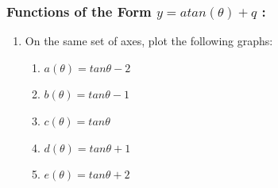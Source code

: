             \subsubsection{  Functions of the Form $y=atan\left(\theta \right)+q$ :}
            \nopagebreak
            
        \label{m39414*id90310}\begin{enumerate}[noitemsep, label=\textbf{\arabic*}. ] 
            \label{m39414*uid74}\item On the same set of axes, plot the following graphs:
\label{m39414*id90326}\begin{enumerate}[noitemsep, label=\textbf{\alph*}. ] 
            \label{m39414*uid75}\item \begin{math}a\left(\theta \right)=tan\theta -2\end{math}\label{m39414*uid76}\item \begin{math}b\left(\theta \right)=tan\theta -1\end{math}\label{m39414*uid77}\item \begin{math}c\left(\theta \right)=tan\theta \end{math}\label{m39414*uid78}\item \begin{math}d\left(\theta \right)=tan\theta +1\end{math}\label{m39414*uid79}\item \begin{math}e\left(\theta \right)=tan\theta +2\end{math}\end{enumerate}
        

\end{enumerate}
